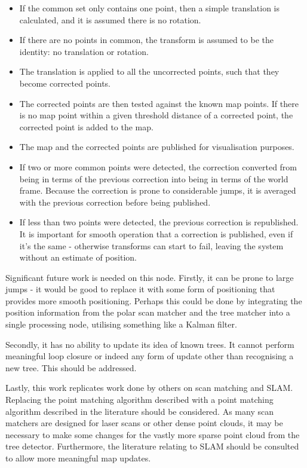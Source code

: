 \documentclass[12pt,oneside,a4paper]{book}
\begin{document}
\begin{itemize}
\item If the common set only contains one point, then a simple
  translation is calculated, and it is assumed there is no rotation.
\item If there are no points in common, the transform is assumed to be
  the identity: no translation or rotation.
\item The translation is applied to all the uncorrected points, such
  that they become corrected points.
\item The corrected points are then tested against the known map
  points. If there is no map point within a given threshold distance
  of a corrected point, the corrected point is added to the map.
\item The map and the corrected points are published for visualisation
  purposes.
\item If two or more common points were detected, the correction
  converted from being in terms of the previous correction into being
  in terms of the world frame. Because the correction is prone to
  considerable jumps, it is averaged with the previous correction
  before being published.
\item If less than two points were detected, the previous correction
  is republished. It is important for smooth operation that a
  correction is published, even if it's the same - otherwise
  transforms can start to fail, leaving the system without an estimate
  of position.
\end{itemize}

Significant future work is needed on this node.  Firstly, it can be
prone to large jumps - it would be good to replace it with some form
of positioning that provides more smooth positioning. Perhaps this
could be done by integrating the position information from the polar
scan matcher and the tree matcher into a single processing node,
utilising something like a Kalman filter.

Secondly, it has no ability to update its idea of known trees. It
cannot perform meaningful loop closure or indeed any form of update
other than recognising a new tree. This should be addressed.

Lastly, this work replicates work done by others on scan matching and
SLAM. Replacing the point matching algorithm described with a point
matching algorithm described in the literature should be considered.
As many scan matchers are designed for laser scans or other dense
point clouds, it may be necessary to make some changes for the vastly
more sparse point cloud from the tree detector. Furthermore, the
literature relating to SLAM should be consulted to allow more
meaningful map updates.
\end{document}
